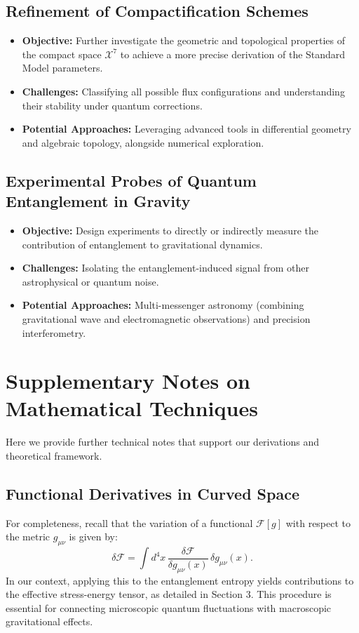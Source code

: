 \documentclass[12pt, a4paper]{article}
\begin{document}
\subsection{Refinement of Compactification Schemes}
\begin{itemize}
    \item \textbf{Objective:} Further investigate the geometric and topological properties of the compact space \(\mathcal{X}^7\) to achieve a more precise derivation of the Standard Model parameters.
    \item \textbf{Challenges:} Classifying all possible flux configurations and understanding their stability under quantum corrections.
    \item \textbf{Potential Approaches:} Leveraging advanced tools in differential geometry and algebraic topology, alongside numerical exploration.
\end{itemize}

\subsection{Experimental Probes of Quantum Entanglement in Gravity}
\begin{itemize}
    \item \textbf{Objective:} Design experiments to directly or indirectly measure the contribution of entanglement to gravitational dynamics.
    \item \textbf{Challenges:} Isolating the entanglement-induced signal from other astrophysical or quantum noise.
    \item \textbf{Potential Approaches:} Multi-messenger astronomy (combining gravitational wave and electromagnetic observations) and precision interferometry.
\end{itemize}

\appendix

\section{Supplementary Notes on Mathematical Techniques}
Here we provide further technical notes that support our derivations and theoretical framework.

\subsection{Functional Derivatives in Curved Space}
For completeness, recall that the variation of a functional \( \mathcal{F}[g] \) with respect to the metric \( g_{\mu\nu} \) is given by:
\begin{equation}
    \delta \mathcal{F} = \int d^4x \, \frac{\delta \mathcal{F}}{\delta g_{\mu\nu}(x)}\, \delta g_{\mu\nu}(x).
\end{equation}
In our context, applying this to the entanglement entropy yields contributions to the effective stress-energy tensor, as detailed in Section 3. This procedure is essential for connecting microscopic quantum fluctuations with macroscopic gravitational effects.
\end{document}
